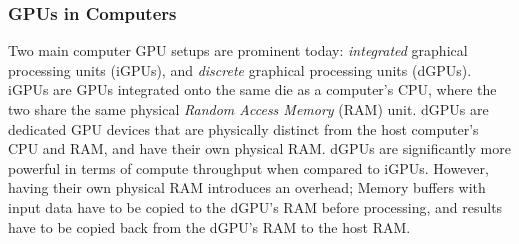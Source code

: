 \subsubsection{GPUs in Computers}

Two main computer GPU setups are prominent today: \textit{integrated} graphical processing units (iGPUs), and \textit{discrete} graphical processing units (dGPUs).
iGPUs are GPUs integrated onto the same die as a computer's CPU, where the two share the same physical \textit{Random Access Memory} (RAM) unit.
dGPUs are dedicated GPU devices that are physically distinct from the host computer's CPU and RAM, and have their own physical RAM.
dGPUs are significantly more powerful in terms of compute throughput when compared to iGPUs.
However, having their own physical RAM introduces an overhead;
Memory buffers with input data have to be copied to the dGPU's RAM before processing, and results have to be copied back from the dGPU's RAM to the host RAM.

